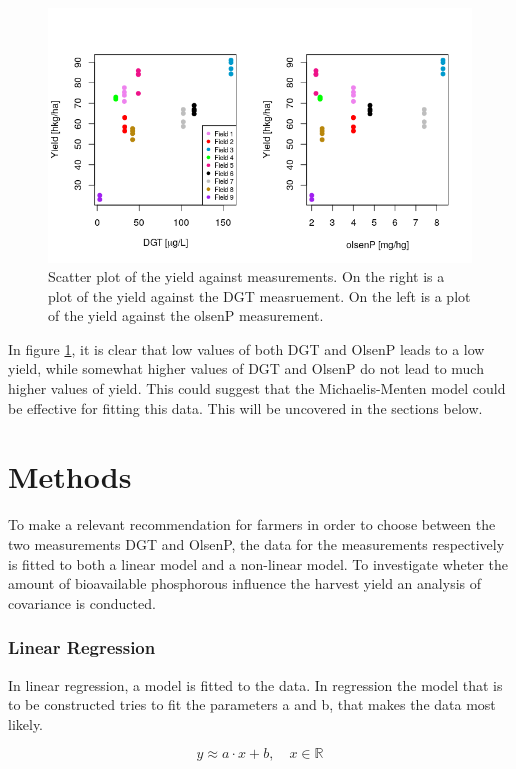 \documentclass[11pt, fleqn, titlepage]{article}
\begin{document}
\begin{figure}[H]
	\centering
	\includegraphics[width=0.7\linewidth]{billeder/measurementz}
	\caption{Scatter plot of the yield against measurements. On the right is a plot of the yield against the DGT measruement. On the left is a plot of the yield against the olsenP measurement.}
	\label{fig:measurementz}
\end{figure}
\noindent
In figure \ref{fig:measurementz}, it is clear that low values of both DGT and OlsenP leads to a low yield, while somewhat higher values of DGT and OlsenP do not lead to much higher values of yield. This could suggest that the Michaelis-Menten model could be effective for fitting this data. This will be uncovered in the sections below.

\section{Methods}
To make a relevant recommendation for farmers in order to choose between the two measurements DGT and OlsenP, the data for the measurements respectively is fitted to both a linear model and a non-linear model. To investigate wheter the amount of bioavailable phosphorous influence the harvest yield an analysis of covariance is conducted.

\subsubsection*{Linear Regression}
In linear regression, a model is fitted to the data. In regression the model that is to be constructed tries to fit the parameters a and b, that makes the data most likely.

\[ y \approx a \cdot x + b, \quad x \in \mathbb R  \]
\end{document}
